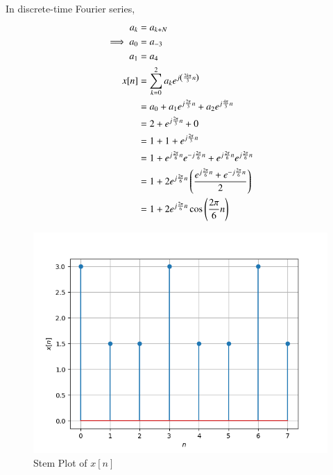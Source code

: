 \documentclass[journal,12pt,twocolumn]{IEEEtran}
\theoremstyle{remark}
\begin{document}
In discrete-time Fourier series,
\begin{align}
a_k &= a_{k+N}\\
\implies a_0&=a_{-3}\\
a_1&=a_{4}\\
x[n] &= \sum_{k=0}^{2}a_ke^{j\left(\frac{2k\pi}{3}n\right)} \\
&= a_0 + a_1e^{j\frac{2\pi}{3}n} + a_2e^{j\frac{4\pi}{3}n} \\
&= 2 + e^{j\frac{2\pi}{3}n}+0\\
&= 1+1+e^{j\frac{2\pi}{3}n}\\
&= 1+e^{j\frac{2\pi}{6}n}e^{-j\frac{2\pi}{6}n}+e^{j\frac{2\pi}{6}n}e^{j\frac{2\pi}{6}n}\\
&= 1+2e^{j\frac{2\pi}{6}n}\left(\frac{e^{j\frac{2\pi}{6}n}+e^{-j\frac{2\pi}{6}n}}{2}\right) \\
&= 1+2e^{j\frac{2\pi}{6}n}\cos{\ensuremath{\left(\frac{2\pi}{6}n\right)}}
\end{align}
\begin{figure}[htbp]
	\includegraphics[width=\columnwidth]{figs/plot.png}
	\caption{Stem Plot of $x[n]$}
	\label{fig:plot_ee49}
\end{figure}
\end{document}
